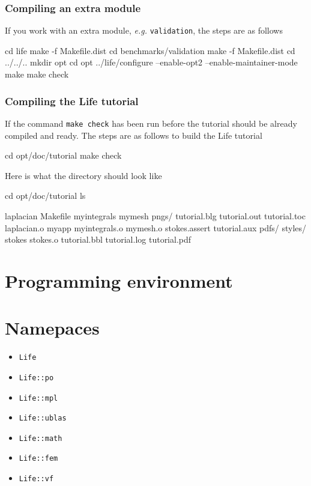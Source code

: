 \documentclass[a4paper]{book}
\begin{document}
\subsubsection{Compiling an extra module}
\label{sec:compile-an-extra}

If you work with an extra module, \emph{e.g.} \lstinline!validation!, the steps are as follows
\begin{unixcom}
cd life
make -f Makefile.dist
cd benchmarks/validation
make -f Makefile.dist
cd ../../..
mkdir opt
cd opt
../life/configure --enable-opt2 --enable-maintainer-mode
make
make check
\end{unixcom}


\subsubsection{Compiling the Life tutorial}
\label{sec:comp-life-tutor}
If the command \lstinline!make check! has been run before the tutorial
should be already compiled and ready. The steps are as follows  to build the Life tutorial
\begin{unixcom}
  cd opt/doc/tutorial
  make check
\end{unixcom}
Here is what the directory should look like
\begin{unixcom}
  cd opt/doc/tutorial
  ls

  laplacian     Makefile      myintegrals   mymesh       pngs/
  tutorial.blg  tutorial.out  tutorial.toc  laplacian.o  myapp
  myintegrals.o mymesh.o      stokes.assert tutorial.aux pdfs/ styles/
  stokes        stokes.o      tutorial.bbl  tutorial.log tutorial.pdf
\end{unixcom}


\section{Programming environment}

\section{Namepaces}

\begin{itemize}
\item \lstinline!Life!
\item \lstinline!Life::po!
\item \lstinline!Life::mpl!
\item \lstinline!Life::ublas!
\item \lstinline!Life::math!
\item \lstinline!Life::fem!
\item \lstinline!Life::vf!

\end{itemize}
\end{document}
